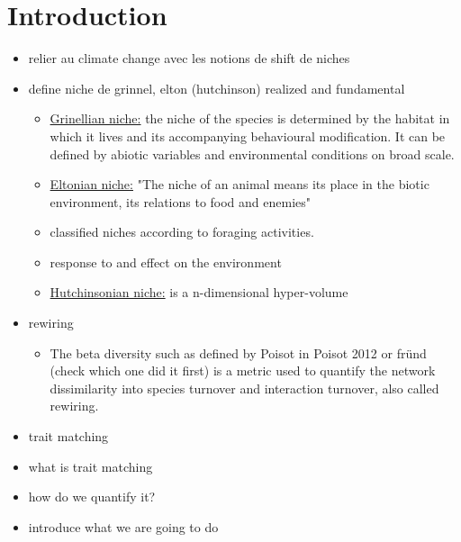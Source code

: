 \section{Introduction}




\begin{itemize}
    \item relier au climate change avec les notions de shift de niches
    \item define niche de grinnel, elton (hutchinson) realized and fundamental
    \begin{itemize}
        \item \underline{Grinellian niche:} the niche of the species is determined by the habitat in which it lives and its accompanying behavioural modification. It can be defined by abiotic variables and environmental conditions on broad scale.
        \item \underline{Eltonian niche:} "The niche of an animal means its place in the biotic environment, its relations to food and enemies"
        \item classified niches according to foraging activities.
        \item response to and effect on the environment
        \item \underline{Hutchinsonian niche:} is a n-dimensional hyper-volume
    \end{itemize}
    \item rewiring
    \begin{itemize}
        \item The beta diversity such as defined by Poisot in Poisot 2012 or fründ (check which one did it first) is a metric used to quantify the network  dissimilarity into species turnover and interaction turnover, also called rewiring.
    \end{itemize}
    \item trait matching
        \item what is trait matching
        \item how do we quantify it?
    \item introduce what we are going to do
\end{itemize}

